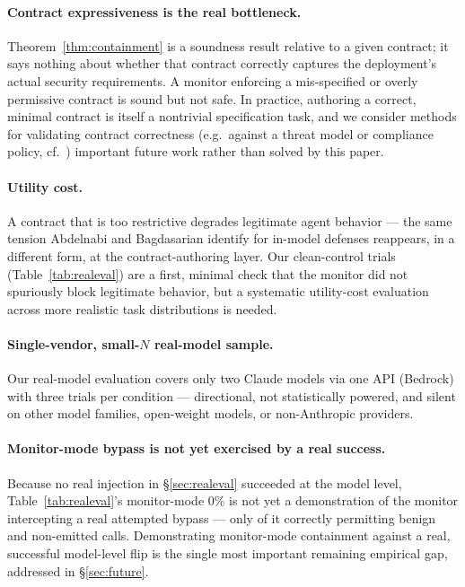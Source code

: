 \documentclass[11pt]{article}
\begin{document}
\paragraph{Contract expressiveness is the real bottleneck.} Theorem~\ref{thm:containment}
is a soundness result relative to a given contract; it says nothing about whether that
contract correctly captures the deployment's actual security requirements. A monitor
enforcing a mis-specified or overly permissive contract is sound but not safe. In practice,
authoring a correct, minimal contract is itself a nontrivial specification task, and we
consider methods for validating contract correctness (e.g.\ against a threat model or
compliance policy, cf.\ \citep{kholkar2026policy}) important future work rather than solved
by this paper.

\paragraph{Utility cost.} A contract that is too restrictive degrades legitimate agent
behavior — the same tension Abdelnabi and Bagdasarian identify for in-model defenses
reappears, in a different form, at the contract-authoring layer. Our clean-control trials
(Table~\ref{tab:realeval}) are a first, minimal check that the monitor did not
spuriously block legitimate behavior, but a systematic utility-cost evaluation across more
realistic task distributions is needed.

\paragraph{Single-vendor, small-$N$ real-model sample.} Our real-model evaluation covers
only two Claude models via one API (Bedrock) with three trials per condition — directional,
not statistically powered, and silent on other model families, open-weight models, or
non-Anthropic providers.

\paragraph{Monitor-mode bypass is not yet exercised by a real success.} Because no real
injection in \S\ref{sec:realeval} succeeded at the model level, Table~\ref{tab:realeval}'s
monitor-mode 0\% is not yet a demonstration of the monitor intercepting a real attempted
bypass — only of it correctly permitting benign and non-emitted calls. Demonstrating
monitor-mode containment against a real, successful model-level flip is the single most
important remaining empirical gap, addressed in \S\ref{sec:future}.
\end{document}
